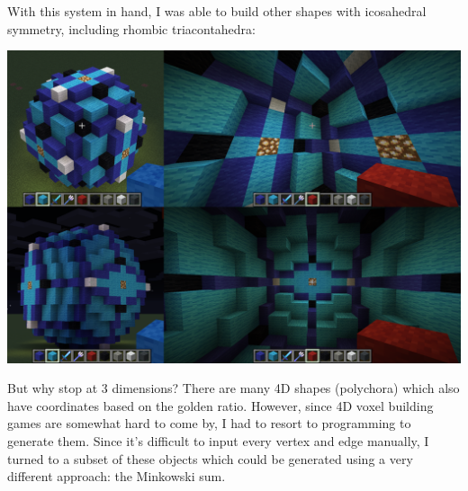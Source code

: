 \documentclass{article}
\begin{document}
With this system in hand, I was able to build other shapes with icosahedral symmetry,
including rhombic triacontahedra:

\begin{center}
\includegraphics[width=\linewidth]{tria.png}
\end{center}

But why stop at 3 dimensions?
There are many 4D shapes (polychora) which also have coordinates based on the golden ratio.
However, since 4D voxel building games are somewhat hard to come by,
I had to resort to programming to generate them.
Since it's difficult to input every vertex and edge manually,
I turned to a subset of these objects which could be generated using a very different approach:
the Minkowski sum.
\end{document}
